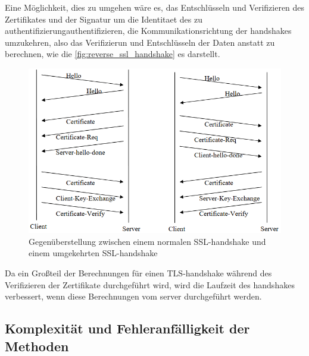 Eine Möglichkeit, dies zu umgehen wäre es, das Entschlüsseln und Verifizieren des Zertifikates und der Signatur um die Identitaet des  zu \gls{authentifizierung}{authentifizieren}, die Kommunikationsrichtung der \glspl{handshake} umzukehren, also das Verifizierun und Entschlüsseln der Daten  anstatt  zu berechnen\autocite[\vglf][]{cryptoeprint:2006/212}, wie die \autoref{fig:reverse_ssl_handshake}\autocite[]{cryptoeprint:2006/212} es darstellt.
\begin{figure}[htpb]
    \centering
    \includegraphics[width=0.75\linewidth]{abbildungen/reverse_ssl_handshake}
    \caption[Gegenüberstellung zwischen einem normalen SSL-Handshake und einem umgekehrten SSL-Handshake]{Gegenüberstellung zwischen einem normalen \ac{SSL}-\gls{handshake} und einem umgekehrten \ac{SSL}-\gls{handshake}\footnotemark}
    \label{fig:reverse_ssl_handshake}
\end{figure}
Da ein Großteil der Berechnungen für einen \ac{TLS}-\gls{handshake} während des Verifizieren der Zertifikate durchgeführt wird, wird die Laufzeit des \glspl{handshake} verbessert, wenn diese Berechnungen vom \gls{server} durchgeführt werden.

\subsection[Komplexität und Fehleranfälligkeit der Kryptografischen Methoden]{Komplexität und Fehleranfälligkeit der  Methoden}\label{subsec:komplexitaet_und_fehleranfaelligkeit_der_kryptografie}

